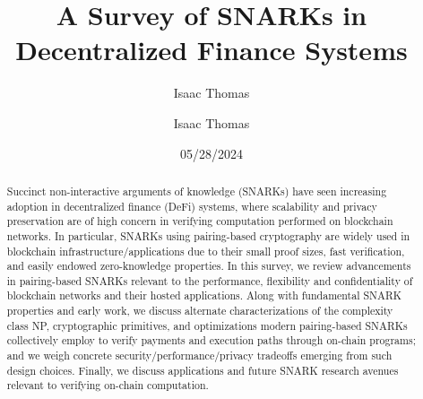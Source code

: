 \documentclass[envcountsame,runningheads,notitlepage]{llncs}
\title{A Survey of SNARKs in Decentralized Finance Systems}
\date{05/28/2024}
\author{
  Isaac Thomas\inst{1}
}%
\institute{Computer Science \& Engineering, UC San Diego\\
  \href{mailto:isthomas@ucsd.edu}{isthomas@ucsd.edu}
}  %
\author{Isaac Thomas}
\institute{University of California, San Diego}
\begin{document}
  \maketitle

\begin{abstract}
Succinct non-interactive arguments of knowledge (SNARKs) have seen increasing adoption in decentralized finance (DeFi) systems, where scalability and privacy preservation are of high concern in verifying computation performed on blockchain networks. In particular, SNARKs using pairing-based cryptography are widely used in blockchain infrastructure/applications due to their small proof sizes, fast verification, and easily endowed zero-knowledge properties. In this survey, we review advancements in pairing-based SNARKs relevant to the performance, flexibility and confidentiality of blockchain networks and their hosted applications. Along with fundamental SNARK properties and early work, we discuss alternate characterizations of the complexity class NP, cryptographic primitives, and optimizations modern pairing-based SNARKs collectively employ to verify payments and execution paths through on-chain programs; and we weigh concrete security/performance/privacy tradeoffs emerging from such design choices. Finally, we discuss applications and future SNARK research avenues relevant to verifying on-chain computation.
\end{abstract}







\newpage
\ifnum{}
  
 \else
   
 \fi

\end{document}
